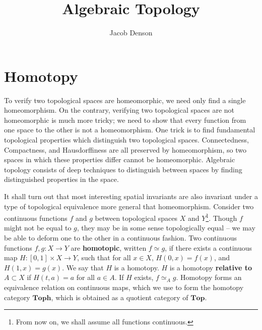 

\DeclareMathOperator{\Dom}{Dom}

\title{Algebraic Topology}
\author{Jacob Denson}




\maketitle

\tableofcontents


\chapter{Homotopy}

To verify two topological spaces are homeomorphic, we need only find a single homeomorphism. On the contrary, verifying two topological spaces are not homeomorphic is much more tricky; we need to show that every function from one space to the other is not a homeomorphism. One trick is to find fundamental topological properties which distinguish two topological spaces. Connectedness, Compactness, and Hausdorffiness are all preserved by homeomorphism, so two spaces in which these properties differ cannot be homeomorphic. Algebraic topology consists of deep techniques to distinguish between spaces by finding distinguished properties in the space.

It shall turn out that most interesting spatial invariants are also invariant under a type of topological equivalence more general that homeomorphism. Consider two continuous functions $f$ and $g$ between topological spaces $X$ and $Y$\footnote{From now on, we shall assume all functions continuous.}. Though $f$ might not be equal to $g$, they may be in some sense topologically equal -- we may be able to deform one to the other in a continuous fashion. Two continuous functions $f,g: X \to Y$ are {\bf homotopic}, written $f \simeq g$, if there exists a continuous map $H: [0,1] \times X \to Y$, such that for all $x \in X$, $H(0,x) = f(x)$, and $H(1,x) = g(x)$. We say that $H$ is a homotopy. $H$ is a homotopy {\bf relative to} $A \subset X$ if $H(t,a) = a$ for all $a \in A$. If $H$ exists, $f \simeq_A g$. Homotopy forms an equivalence relation on continuous maps, which we use to form the homotopy category $\textbf{Toph}$, which is obtained as a quotient category of $\textbf{Top}$. 

